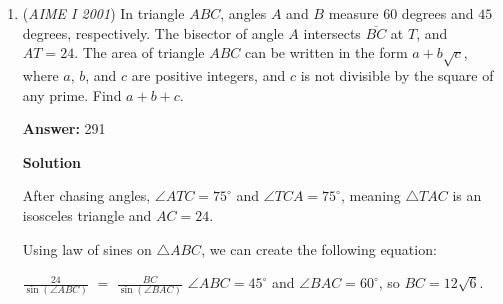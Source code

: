 \begin{enumerate}
We begin by introducing a substitution. Let $x=\frac{1}{4}-y$. Substituting this into our equation gives 
 \[\left(\left(\frac{1}{4}\right)^{2001}-2001\left(\frac{1}{4}\right)^{2000}y+\binom{2001}{2}\left(\frac{1}{4}\right)^{1999}y^2+\cdots-y^{2001}\right)+\left(\left(\frac{1}{4}\right)^{2001}+2001\left(\frac{1}{4}\right)^{2000}y+\binom{2001}{2}\left(\frac{1}{4}\right)^{1999}y^2+\cdots+y^{2001}\right)=0.\] We can expand this out, canceling common terms, giving us, 
 \[2\left(\frac{1}{4}\right)^{2001}+2\binom{2001}{2}\left(\frac{1}{4}\right)^{1999}y^2+\cdots+2\binom{2001}{2000}\left(\frac{1}{4}\right)y^{2000}=0.\] We can clean it up by simply multiplying both sides by $2$, giving, 
 \[\frac{1}{4^{2000}}+\binom{2001}{2}\frac{y^2}{4^{1998}}+\binom{2001}{4}\frac{y^4}{4^{1996}}+\cdots+\binom{2001}{2000}y^{2000}.\] At first it may seem like we haven't progressed whatsoever, but we can revisit what the problem is asking. We aren't trying to find every root of this, but rather the sum of $\frac{1}{4}$ minus every root. Assume the roots were $r_1,r_2,...$. This means that our answer would be $\frac{1}{4}n-(r_1+r_2+...)$, where $n$ is the number of roots. By Vieta's formulas, $r_1+r_2+...=-\frac{0}{\binom{2001}{2000}}=0$. Thus all we need to find is $\frac{1}{4}n$, which is $\frac{1}{4}$ of the total number of roots. By the fundamental theorem of algebra, there are $2000$ roots of this polynomial. This gives us a final answer of $\frac{1}{4}\cdot 2000$, which is $\boxed{500}$



	\item (\textit{AIME I 2001}) In triangle $ABC$, angles $A$ and $B$ measure $60$ degrees and $45$ degrees, respectively. The bisector of angle $A$ intersects $\overline{BC}$ at $T$, and $AT=24$. The area of triangle $ABC$ can be written in the form $a+b\sqrt{c}$, where $a$, $b$, and $c$ are positive integers, and $c$ is not divisible by the square of any prime. Find $a+b+c$.


 
 \textbf{Answer: }291



\textbf{Solution}

After chasing angles, $\angle ATC=75^{\circ}$ and $\angle TCA=75^{\circ}$, meaning $\triangle TAC$ is an isosceles triangle and $AC=24$.

 Using law of sines on $\triangle ABC$, we can create the following equation:

 $\frac{24}{\sin(\angle ABC)}$ $=$ $\frac{BC}{\sin(\angle BAC)}$
$\angle ABC=45^{\circ}$ and $\angle BAC=60^{\circ}$, so $BC = 12\sqrt{6}$.


\end{enumerate}
